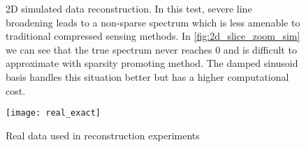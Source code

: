 \documentclass[11pt]{article}
\begin{document}
\begin{figure}
\centering
{}
\qquad
{}
\qquad
{}
\qquad
{}
\qquad
\caption{2D simulated data reconstruction. In this test, severe line broadening leads to a non-sparse spectrum which is less amenable to traditional compressed sensing methods. In \cref{fig:2d_slice_zoom_sim} we can see that the true spectrum never reaches $0$ and is difficult to approximate with sparsity promoting method. The damped sinusoid basis handles this situation better but has a higher computational cost. }
\label{fig:2D_sim}
\end{figure}


\begin{figure}
\centering
\texttt{[image: real\_exact]}
\caption{Real data used in reconstruction experiments}
\label{fig:real_exact}
\end{figure}
\end{document}
